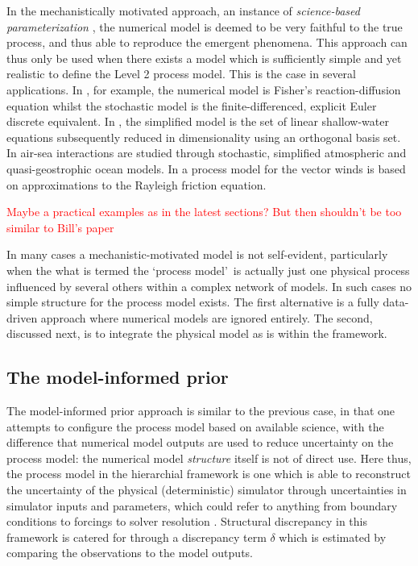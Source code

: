 \documentclass[10pt,a4paper]{article}
\newcommand{\red}{\textcolor{red}}
\begin{document}
In the mechanistically motivated approach, an instance of \emph{science-based parameterization} \citep{Leeds_2012}, the numerical model is deemed to be very faithful to the true process, and thus able to reproduce the emergent phenomena. This approach can thus only be used when there exists a model which is sufficiently simple and yet realistic to define the Level 2 process model. This is the case in several applications.  In \cite{Hooten_2008}, for example, the numerical model is Fisher's reaction-diffusion equation whilst the stochastic model is the finite-differenced, explicit Euler discrete equivalent. In \cite{Wikle_2001}, the simplified model is the set of linear shallow-water equations subsequently reduced in dimensionality using an orthogonal basis set. In \cite{Berliner_2003b} air-sea interactions are studied through stochastic, simplified atmospheric and quasi-geostrophic ocean models. In \cite{Milliff_2011} a process model for the vector winds is based on approximations to the Rayleigh friction equation. 

\red{Maybe a practical examples as in the latest sections? But then shouldn't be too similar to Bill's paper}

In many cases a mechanistic-motivated model is not self-evident, particularly when the what is termed the \lq process model\rq~is actually just one physical process influenced by several others within a complex network of models. In such cases no simple structure for the process model exists. The first alternative is a fully data-driven approach where numerical models are ignored entirely. The second, discussed next, is to integrate the physical model as is within the framework.


\subsection{The model-informed prior}

The model-informed prior approach is similar to the previous case, in that one attempts to configure the process model based on available science, with the difference that numerical model outputs are used to reduce uncertainty on the process model: the numerical model \emph{structure} itself is not of direct use.  Here thus, the process model in the hierarchial framework is one which is able to reconstruct the uncertainty of the physical (deterministic) simulator through uncertainties in simulator inputs and parameters, which could refer to anything from boundary conditions to forcings to solver resolution \citep{Goldstein_2009}. Structural discrepancy in this framework is catered for through a discrepancy term $\delta$ which is estimated by comparing the observations to the model outputs.
\end{document}
